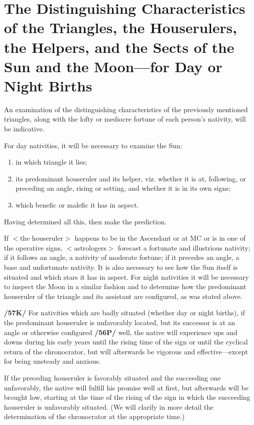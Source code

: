 \section{The Distinguishing Characteristics of the Triangles, the Houserulers, the Helpers, and the Sects of the Sun and the Moon—for Day or Night Births}

An examination of the distinguishing characteristics of the previously mentioned triangles, along with the lofty or mediocre fortune of each person’s nativity, will be indicative. 

\mnm[0.3cm]
For day nativities, it will be necessary to examine the Sun: 
\begin{enumerate}
\item in which triangle it lies;
\item its predominant houseruler and its helper, viz. whether it is at, following, or preceding an angle, rising or setting, and whether it is in its own signs;
\item which benefic or malefic it has in aspect. 
\end{enumerate}
Having determined all this, then make the prediction. 

\mndl[0.2cm]
If $<$the houseruler$>$ happens to be in the Ascendant or at MC or is in one of the operative signs, $<$astrologers$>$ forecast a fortunate and illustrious nativity; if it follows an angle, a nativity of moderate fortune; if it precedes an angle, a base and unfortunate nativity. It is also necessary to see how the Sun itself is situated and which stars it has in aspect. For night nativities it will be necessary to inspect the Moon in a similar fashion and to determine how the predominant houseruler of the triangle and its assistant are configured, as was stated above.

\textbf{/57K/} For nativities which are badly situated (whether day or night births), if the predominant
houseruler is unfavorably located, but its successor is at an angle or otherwise configured \textbf{/56P/} well, the
native will experience ups and downs during his early years until the rising time of the sign or until the cyclical return of the chronocrator, but will afterwards be vigorous and effective—except for being unsteady and anxious. 

If the preceding houseruler is favorably situated and the succeeding one unfavorably, the native will fulfill his promise well at first, but afterwards will be brought low, starting at the time of the rising of the sign in which the succeeding houseruler is unfavorably situated. (We will clarify in more detail the determination of the chronocrator at the appropriate time.) 

